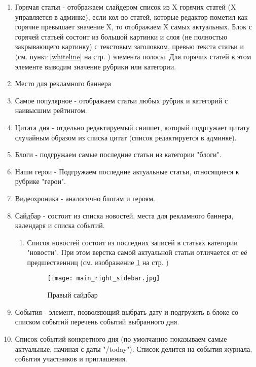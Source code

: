 \documentclass[DIV=calc, paper=a4, fontsize=11pt]{scrartcl} %
\begin{document}
\begin{enumerate}
    \item Горячая статья - отображаем слайдером список из X горячих статей (X управляется в админке), если кол-во статей, которые редактор пометил как горячие превышает значение X, то отображаем X самых актуальных. Блок с горячей статьей состоит из большой картинки и слоя (не полностью закрывающего картинку) с текстовым заголовком, превью текста статьи и (см. пункт \ref{whiteline} на стр. \pageref{whiteline} ) элемента полосы. Для горячих статей в этом элементе выводим значение рубрики или категории.
    \item Место для рекламного баннера
    \item \label{subsec:mostpopular}Самое популярное - отображаем статьи любых рубрик и категорий с наивысшим рейтингом.
    \item Цитата дня - отдельно редактируемый сниппет, который подргужает цитату случайным образом из списка цитат (список редактируется в админке).
    \item Блоги - подгружаем  самые последние статьи из категории "блоги".
    \item Наши герои - Подгружаем последние актуальные статьи, относящиеся к рубрике "герои".
    \item Видеохроника - аналогично блогам и героям.
    \item Сайдбар - состоит из списка новостей, места для рекламного баннера, календаря и списка событий.
        \begin{enumerate}
            \item Список новостей состоит из последних записей в статьях категории "новости". При этом верстка самой актуальной статьи отличается от её предшественниц (см. изображение \ref{fig:main_right_sidebar.jpg} на стр. \pageref{fig:main_right_sidebar.jpg})
            \begin{figure}[ht!]
            \centering
            \texttt{[image: main\_right\_sidebar.jpg]}
            \caption{Правый сайдбар \label{fig:main_right_sidebar.jpg}}
            \end{figure}
        \end{enumerate}
    \item События - элемент, позволяющий выбрать дату и подгрузить в блоке со списком событий перечень событий  выбранного дня.
    \item Список событий конкретного дня (по умолчанию показываем самые актуальные, начиная с даты "/today"). Список делится на события журнала, события участников и приглашения.

\end{enumerate}
\end{document}
